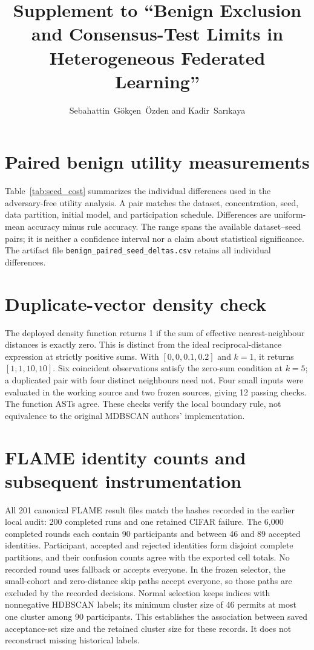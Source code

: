 \documentclass[journal]{IEEEtran}
\begin{document}
\title{Supplement to ``Benign Exclusion and Consensus-Test Limits in Heterogeneous Federated Learning''}
\author{Sebahattin~G\"ok\c{c}en~\"Ozden and Kadir~Sar{\i}kaya}
\maketitle
\section{Paired benign utility measurements}
Table~\ref{tab:seed_cost} summarizes the individual differences used in the adversary-free utility analysis. A pair matches the dataset, concentration, seed, data partition, initial model, and participation schedule. Differences are uniform-mean accuracy minus rule accuracy. The range spans the available dataset--seed pairs; it is neither a confidence interval nor a claim about statistical significance. The artifact file \texttt{benign\_paired\_seed\_deltas.csv} retains all individual differences.


\section{Duplicate-vector density check}
The deployed density function returns 1 if the sum of effective nearest-neighbour distances is exactly zero. This is distinct from the ideal reciprocal-distance expression at strictly positive sums. With $[0,0,0.1,0.2]$ and $k=1$, it returns $[1,1,10,10]$. Six coincident observations satisfy the zero-sum condition at $k=5$; a duplicated pair with four distinct neighbours need not. Four small inputs were evaluated in the working source and two frozen sources, giving 12 passing checks. The function ASTs agree. These checks verify the local boundary rule, not equivalence to the original MDBSCAN authors' implementation.

\section{FLAME identity counts and subsequent instrumentation}
All 201 canonical FLAME result files match the hashes recorded in the earlier local audit: 200 completed runs and one retained CIFAR failure. The 6,000 completed rounds each contain 90 participants and between 46 and 89 accepted identities. Participant, accepted and rejected identities form disjoint complete partitions, and their confusion counts agree with the exported cell totals. No recorded round uses fallback or accepts everyone. In the frozen selector, the small-cohort and zero-distance skip paths accept everyone, so those paths are excluded by the recorded decisions. Normal selection keeps indices with nonnegative HDBSCAN labels; its minimum cluster size of 46 permits at most one cluster among 90 participants. This establishes the association between saved acceptance-set size and the retained cluster size for these records. It does not reconstruct missing historical labels.
\end{document}
